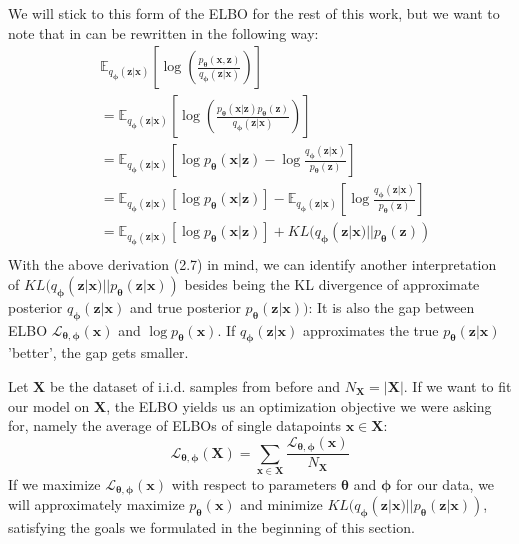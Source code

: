 \documentclass[12pt]{report}
\theoremstyle{definition}
\begin{document}
We will stick to this form of the ELBO for the rest of this work, but we want to note that in can be rewritten in the following way:
\begin{equation}
\begin{split}
& \mathbb{E}_{q_{\pmb{\phi}}(\mathbf{z}|\mathbf{x})}\left[ \log\left(\frac{p_{\pmb{\theta}}(\mathbf{x}, \mathbf{z})}{q_{\pmb{\phi}}(\mathbf{z}|\mathbf{x})}\right) \right] \\
& = \mathbb{E}_{q_{\pmb{\phi}}(\mathbf{z}|\mathbf{x})}\left[ \log\left(\frac{p_{\pmb{\theta}}(\mathbf{x}|\mathbf{z})p_{\pmb{\theta}}(\mathbf{z})}{q_{\pmb{\phi}}(\mathbf{z}|\mathbf{x})}\right) \right] \\
	& = \mathbb{E}_{q_{\pmb{\phi}}(\mathbf{z}|\mathbf{x})}\left[ \log p_{\pmb{\theta}}(\mathbf{x}| \mathbf{z}) - \log \frac{q_{\pmb{\phi}}(\mathbf{z}|\mathbf{x})}{p_{\pmb{\theta}}(\mathbf{z})} \right]	\\
	& = \mathbb{E}_{q_{\pmb{\phi}}(\mathbf{z}|\mathbf{x})}\left[ \log p_{\pmb{\theta}}(\mathbf{x}| \mathbf{z})\right] - \mathbb{E}_{q_{\pmb{\phi}}(\mathbf{z}|\mathbf{x})}\left[\log \frac{q_{\pmb{\phi}}(\mathbf{z}|\mathbf{x})}{p_{\pmb{\theta}}(\mathbf{z})} \right]	\\
	& = \mathbb{E}_{q_{\pmb{\phi}}(\mathbf{z}|\mathbf{x})}\left[ \log p_{\pmb{\theta}}(\mathbf{x}| \mathbf{z})\right] + KL(q_{\pmb{\phi}}(\mathbf{z}|\mathbf{x})||p_{\pmb{\theta}}(\mathbf{z}))\\
\end{split}
\end{equation}
With the above derivation (2.7) in mind, we can identify another interpretation of $KL(q_{\pmb{\phi}}(\mathbf{z}|\mathbf{x}) || p_{\pmb{\theta}}(\mathbf{z}|\mathbf{x}))$ besides being the KL divergence of approximate posterior $q_{\pmb{\phi}}(\mathbf{z}|\mathbf{x})$ and true posterior $p_{\pmb{\theta}}(\mathbf{z}| \mathbf{x}))$: It is also the gap between ELBO $\mathcal{L}_{\pmb{\theta}, \pmb{\phi}}(\mathbf{x})$ and $\log p_{\pmb{\theta}}(\mathbf{x})$. If $q_{\pmb{\phi}}(\mathbf{z}|\mathbf{x})$ approximates the true $p_{\pmb{\theta}}(\mathbf{z}|\mathbf{x})$ 'better', the gap gets smaller.

Let $\mathbf{X}$ be the dataset of i.i.d. samples from before and $N_{\mathbf{X}} = |\mathbf{X}|$. If we want to fit our model on $\mathbf{X}$, the ELBO yields us an optimization objective we were asking for, namely the average of ELBOs of single datapoints $\mathbf{x} \in \mathbf{X}$:
\begin{equation}
	\mathcal{L}_{\pmb{\theta}, \pmb{\phi}}(\mathbf{X}) = \sum_{\mathbf{x} \in \mathbf{X}} \frac{\mathcal{L}_{\pmb{\theta}, \pmb{\phi}}(\mathbf{x})}{N_{\mathbf{X}}}
\end{equation}
If we maximize $\mathcal{L}_{\pmb{\theta}, \pmb{\phi}}(\mathbf{x})$ with respect to parameters $\pmb{\theta}$ and $\pmb{\phi}$ for our data, we will approximately maximize $p_{\pmb{\theta}}(\mathbf{x})$ and minimize $KL(q_{\pmb{\phi}}(\mathbf{z}|\mathbf{x}) || p_{\pmb{\theta}}(\mathbf{z}| \mathbf{x}))$, satisfying the goals we formulated in the beginning of this section.
\end{document}
